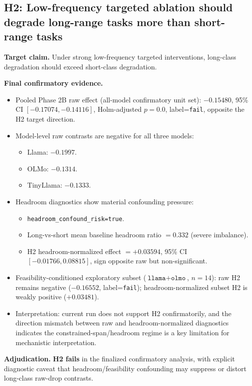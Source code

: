 \documentclass[11pt]{article}
\begin{document}
\subsection{H2: Low-frequency targeted ablation should degrade long-range tasks more than short-range tasks}
\textbf{Target claim.} Under strong low-frequency targeted interventions, long-class degradation should exceed short-class degradation.

\textbf{Final confirmatory evidence.}
\begin{itemize}[leftmargin=*]
  \item Pooled Phase 2B raw effect (all-model confirmatory unit set): \(-0.15480\), 95\% CI \([-0.17074,-0.14116]\), Holm-adjusted \(p=0.0\), label=\texttt{fail}, opposite the H2 target direction.
  \item Model-level raw contrasts are negative for all three models:
  \begin{itemize}
    \item Llama: \(-0.1997\).
    \item OLMo: \(-0.1314\).
    \item TinyLlama: \(-0.1333\).
  \end{itemize}
  \item Headroom diagnostics show material confounding pressure:
  \begin{itemize}
    \item \texttt{headroom\_confound\_risk=true}.
    \item Long-vs-short mean baseline headroom ratio \(=0.332\) (severe imbalance).
    \item H2 headroom-normalized effect \(=+0.03594\), 95\% CI \([-0.01766,0.08815]\), sign opposite raw but non-significant.
  \end{itemize}
  \item Feasibility-conditioned exploratory subset (\(\texttt{llama}+\texttt{olmo}\), \(n=14\)): raw H2 remains negative (\(-0.16552\), label=\texttt{fail}); headroom-normalized subset H2 is weakly positive (\(+0.03481\)).
  \item Interpretation: current run does not support H2 confirmatorily, and the direction mismatch between raw and headroom-normalized diagnostics indicates the constrained-span/headroom regime is a key limitation for mechanistic interpretation.
\end{itemize}

\textbf{Adjudication.} \textbf{H2 fails} in the finalized confirmatory analysis, with explicit diagnostic caveat that headroom/feasibility confounding may suppress or distort long-class raw-drop contrasts.
\end{document}
